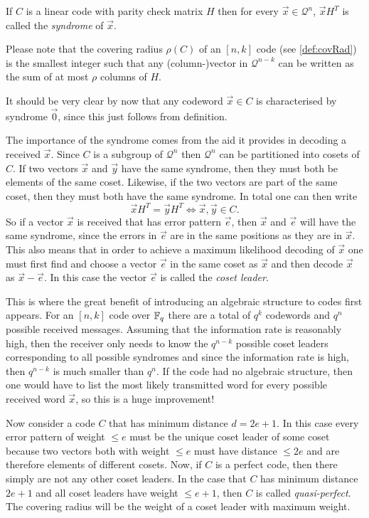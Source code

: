 \begin{defi}
\label{def:syndrome}
	If $C$ is a linear code with parity check matrix $H$ then for every $\vec{x} \in \mathcal{Q}^n$, $\vec{x} H^T$ is called the \emph{syndrome} of $\vec{x}$.
\end{defi}

Please note that the covering radius $\rho \left(C\right)$ of an $\left[n,k\right]$ code (see \cref{def:covRad}) is the smallest integer such that any (column-)vector in $\mathcal{Q}^{n-k}$ can be written as the sum of at most $\rho$ columns of $H$.

It should be very clear by now that any codeword $\vec{x} \in C$ is characterised by syndrome $\vec{0}$, since this just follows from definition.

The importance of the syndrome comes from the aid it provides in decoding a received $\vec{x}$. Since $C$ is a subgroup of $\mathcal{Q}^n$ then $\mathcal{Q}^n$ can be partitioned into cosets of $C$. If two vectors $\vec{x}$ and $\vec{y}$ have the same syndrome, then they must both be elements of the same coset. Likewise, if the two vectors are part of the same coset, then they must both have the same syndrome. In total one can then write
\[
\vec{x} H^T = \vec{y} H^T \Leftrightarrow \vec{x}, \vec{y} \in C.
\]
So if a vector $\vec{x}$ is received that has error pattern $\vec{e}$, then $\vec{x}$ and $\vec{e}$ will have the same syndrome, since the errors in $\vec{e}$ are in the same positions as they are in $\vec{x}$. This also means that in order to achieve a maximum likelihood decoding of $\vec{x}$ one must first find and choose a vector $\vec{e}$ in the same coset as $\vec{x}$ and then decode $\vec{x}$ as $\vec{x} - \vec{e}$. In this case the vector $\vec{e}$ is called the \emph{coset leader}.

This is where the great benefit of introducing an algebraic structure to codes first appears. For an $\left[n,k\right]$ code over $\mathbb{F}_q$ there are a total of $q^k$ codewords and $q^n$ possible received messages. Assuming that the information rate is reasonably high, then the receiver only needs to know the $q^{n-k}$ possible coset leaders corresponding to all possible syndromes and since the information rate is high, then $q^{n-k}$ is much smaller than $q^n$. If the code had no algebraic structure, then one would have to list the most likely transmitted word for every possible received word $\vec{x}$, so this is a huge improvement!

Now consider a code $C$ that has minimum distance $d = 2e+1$. In this case every error pattern of weight $\leq e$ must be the unique coset leader of some coset because two vectors both with weight $\leq e$ must have distance $\leq 2e$ and are therefore elements of different cosets. Now, if $C$ is a perfect code, then there simply are not any other coset leaders. In the case that $C$ has minimum distance $2e+1$ and all coset leaders have weight $\leq e+1$, then $C$ is called \emph{quasi-perfect}. The covering radius will be the weight of a coset leader with maximum weight.

